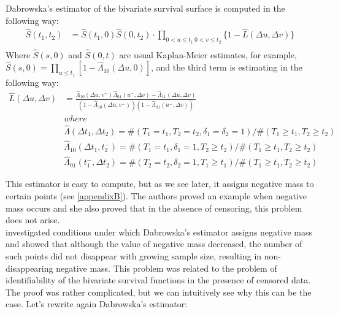 \documentclass[]{article}
\begin{document}
Dabrowska's estimator of the bivariate survival surface is computed in the following way:
	$$
	\begin{aligned}
		\hat{S}(t_1,t_2) &= \hat{S}(t_1,0)\hat{S}(0,t_2)\cdot \prod_{{0<u\leq t_1~0<v\leq t_2}}\{1 - \hat{L}(\Delta u, \Delta v)\}\\
	\end{aligned}
	$$
Where $\hat{S}(s,0)$ and $\hat{S}(0,t)$ are usual Kaplan-Meier estimates, for example, $\hat{S}(s,0) = \prod_{u\leq t_1}[1-\hat{\Lambda}_{10}(\Delta u, 0)]$, and the third term is estimating in the following way:
	$$
	\begin{aligned}
    \hat{L}(\Delta u, \Delta v) &= \frac{\hat{\Lambda}_{10}(\Delta u,v^-)\hat{\Lambda}_{01}(u^-,\Delta v) - \hat{\Lambda}_{11}(\Delta u,\Delta v)}{\left(1-\hat{\Lambda}_{10}(\Delta u,v^-)\right)\left(1-\hat{\Lambda}_{01}(u^-,\Delta v)\right)}\\
  &where\\
	&\hat{\Lambda}(\Delta t_1, \Delta t_2) = \#(T_1=t_1, T_2=t_2, \delta_1=\delta_2=1)/\#(T_1\geq t_1, T_2\geq t_2)\\
	&\hat{\Lambda}_{10}(\Delta t_1, t_2^-) = \#(T_1=t_1, \delta_1=1, T_2\geq t_2)/\#(T_1\geq t_1, T_2\geq t_2)\\
	&\hat{\Lambda}_{01}(t_1^-,\Delta  t_2) = \#(T_2=t_2, \delta_2=1, T_1\geq t_1)/\#(T_1\geq t_1, T_2\geq t_2)
	\end{aligned}
	$$

This estimator is easy to compute, but as we see later, it assigns negative mass to certain points (see \ref{appendixB}). The authors proved an example when negative mass occurs and she also proved that in the absence of censoring, this problem does not arise.\\

\cite{pruitt1991negative} investigated conditions under which Dabrowska's estimator assigns negative mass and showed that although the value of negative mass decreased, the number of such points did not disappear with growing sample size, resulting in non-disappearing negative mass. This problem was related to the problem of identifiability of the bivariate survival functions in the presence of censored data. The proof was rather complicated, but we can intuitively see why this can be the case. Let's rewrite again Dabrowska's estimator:
\end{document}

